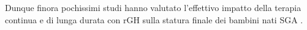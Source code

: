 Dunque finora pochissimi studi hanno valutato l'effettivo impatto della terapia continua e di lunga durata con rGH sulla statura finale dei bambini nati SGA . 






 





